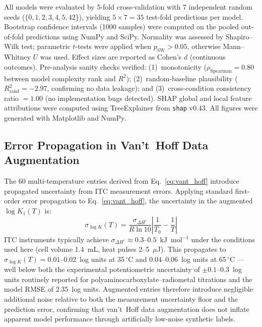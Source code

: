 \documentclass[journal=jacsat,manuscript=article]{achemso}
\begin{document}
All models were evaluated by 5-fold cross-validation with 7 independent random seeds
($\{0, 1, 2, 3, 4, 5, 42\}$), yielding $5 \times 7 = 35$ test-fold predictions
per model.
Bootstrap confidence intervals (1000 samples) were computed on the pooled
out-of-fold predictions using NumPy\cite{Harris2020} and SciPy.
Normality was assessed by Shapiro--Wilk test; parametric $t$-tests were applied
when $p_\mathrm{SW} > 0.05$, otherwise Mann--Whitney $U$ was used.
Effect sizes are reported as Cohen's $d$ (continuous outcomes).
Pre-analysis sanity checks verified: (1)~monotonicity ($\rho_\mathrm{Spearman} = 0.80$
between model complexity rank and $R^2$); (2)~random-baseline plausibility
($R^2_\mathrm{rand} = -2.97$, confirming no data leakage); and
(3)~cross-condition consistency ratio $= 1.00$ (no implementation bugs detected).
SHAP global and local feature attributions were computed using TreeExplainer
from \texttt{shap} v0.43.\cite{Lundberg2017,Lundberg2020}
All figures were generated with Matplotlib\cite{Hunter2007} and NumPy.\cite{Harris2020}

\subsection{Error Propagation in Van't~Hoff Data Augmentation}

The 60 multi-temperature entries derived from Eq.~\ref{eq:vant_hoff} introduce
propagated uncertainty from ITC measurement errors.
Applying standard first-order error propagation to Eq.~\ref{eq:vant_hoff},
the uncertainty in the augmented $\log K_1(T)$ is:
\begin{equation}
  \sigma_{\log K}(T) = \frac{\sigma_{\Delta H^\circ}}{R \ln 10}
    \left|\frac{1}{T_0} - \frac{1}{T}\right|
  \label{eq:error_prop}
\end{equation}
ITC instruments typically achieve $\sigma_{\Delta H^\circ} \approx 0.3$--$0.5$~kJ~mol$^{-1}$
under the conditions used here (cell volume 1.4~mL, heat pulses 2--5~$\mu$J).\cite{Leavitt2001}
This propagates to $\sigma_{\log K}(T) = 0.01$--$0.02$~log units at 35\,$^\circ$C
and $0.04$--$0.06$~log units at 65\,$^\circ$C --- well below both the experimental
potentiometric uncertainty of $\pm 0.1$--$0.3$~log units routinely reported for
polyaminocarboxylate--radiometal titrations\cite{MartellSmith2004,Notni2010} and
the model RMSE of 2.35~log units.
Augmented entries therefore introduce negligible additional noise relative to both
the measurement uncertainty floor and the prediction error, confirming that van't~Hoff
data augmentation does not inflate apparent model performance through artificially
low-noise synthetic labels.
\end{document}
